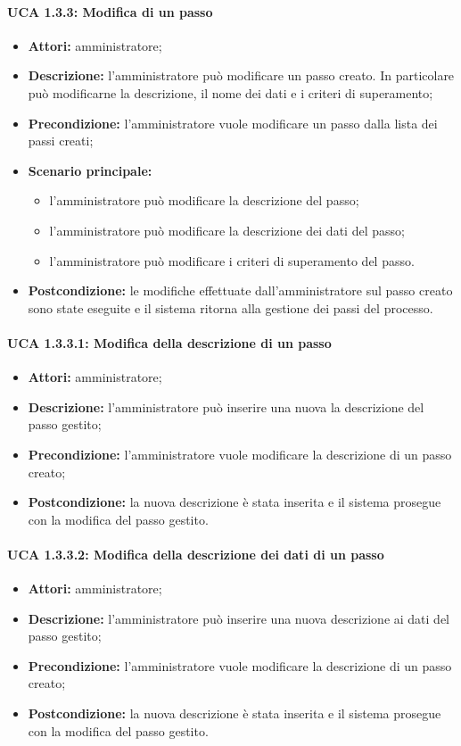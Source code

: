 \paragraph{UCA 1.3.3: Modifica di un passo}
\begin{itemize}
\item \textbf{Attori:} 
amministratore;
\item \textbf{Descrizione:} 
l'amministratore può modificare un passo creato. In particolare può modificarne la descrizione, il nome dei dati e i criteri di superamento; 
\item \textbf{Precondizione:}
l'amministratore vuole modificare un passo dalla lista dei passi creati;
\item \textbf{Scenario principale:} 
\begin{itemize}
\item l'amministratore può modificare la descrizione del passo;
\item l'amministratore può modificare la descrizione dei dati del passo;
\item l'amministratore può modificare i criteri di superamento del passo.
\end{itemize}
\item \textbf{Postcondizione:}
le modifiche effettuate dall'amministratore sul passo creato sono state eseguite e il sistema ritorna alla gestione dei passi del processo. 
\end{itemize}

\paragraph{UCA 1.3.3.1: Modifica della descrizione di un passo}

\begin{itemize}
\item \textbf{Attori:} 
amministratore;
\item \textbf{Descrizione:}
l'amministratore può inserire una nuova la descrizione del passo gestito;
\item \textbf{Precondizione:} 
l'amministratore vuole modificare la descrizione di un passo creato;
\item \textbf{Postcondizione:}
la nuova descrizione è stata inserita e il sistema prosegue con la modifica del passo gestito.
\end{itemize}

\paragraph{UCA 1.3.3.2: Modifica della descrizione dei dati di un passo}
\begin{itemize}
\item \textbf{Attori:} 
amministratore;
\item \textbf{Descrizione:}
l'amministratore può inserire una nuova descrizione ai dati del passo gestito;
\item \textbf{Precondizione:} 
l'amministratore vuole modificare la descrizione di un passo creato;
\item \textbf{Postcondizione:}
la nuova descrizione è stata inserita e il sistema prosegue con la modifica del passo gestito.
\end{itemize}

